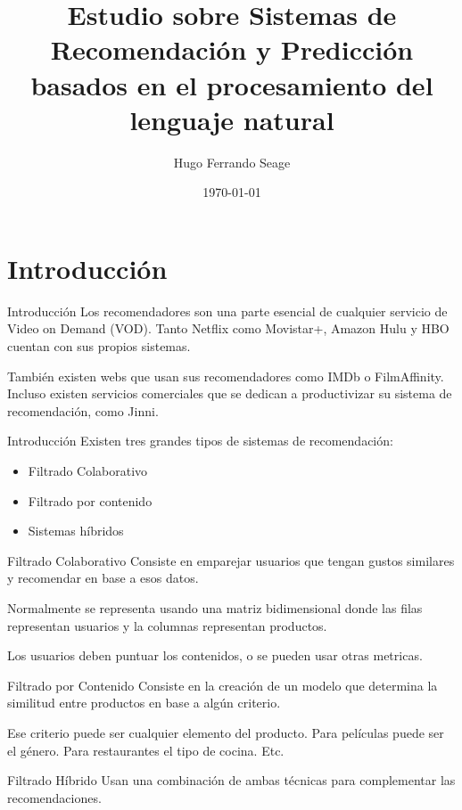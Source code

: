 \documentclass{beamer}
\title{Estudio sobre Sistemas de Recomendación y Predicción basados en el procesamiento del lenguaje natural}
\date{\today}
\author{Hugo Ferrando Seage}
\institute{Universidad Europea de madrid\\Escuela de Arquitectura, Ingeniería y Diseño}
\begin{document}
  \maketitle

  \section{Introducción}
  \begin{frame}{Introducción}
      Los recomendadores son una parte esencial de cualquier servicio de Video on Demand (VOD). Tanto Netflix como Movistar+, Amazon Hulu y HBO cuentan con sus propios sistemas.

      También existen webs que usan sus recomendadores como IMDb o FilmAffinity. Incluso existen servicios comerciales que se dedican a productivizar su sistema de recomendación, como Jinni.
  \end{frame}

  \begin{frame}{Introducción}
      Existen tres grandes tipos de sistemas de recomendación:
      \begin{itemize}
          \item Filtrado Colaborativo
          \item Filtrado por contenido
          \item Sistemas híbridos
      \end{itemize}
  \end{frame}

  \begin{frame}{Filtrado Colaborativo}
      Consiste en emparejar usuarios que tengan gustos similares y recomendar en base a esos datos.

      Normalmente se representa usando una matriz bidimensional donde las filas representan usuarios y la columnas representan productos.

      Los usuarios deben puntuar los contenidos, o se pueden usar otras metricas.
  \end{frame}

  \begin{frame}{Filtrado por Contenido}
      Consiste en la creación de un modelo que determina la similitud entre productos en base a algún criterio.

      Ese criterio puede ser cualquier elemento del producto. Para películas puede ser el género. Para restaurantes el tipo de cocina. Etc.
  \end{frame}

  \begin{frame}{Filtrado Híbrido}
      Usan una combinación de ambas técnicas para complementar las recomendaciones.
  \end{frame}
\end{document}
